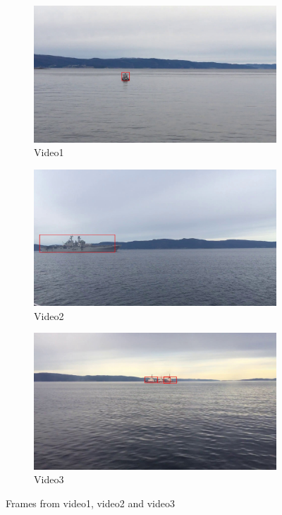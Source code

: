 \begin{figure}[h!]
\centering
\begin{subfigure}[b]{0.78\textwidth}
   \includegraphics[width=1\linewidth]{results/video/video1/frame35.jpg}
   \caption{Video1}
   \label{fig:video1} 
\end{subfigure}

\begin{subfigure}[b]{0.78\textwidth}
   \includegraphics[width=1\linewidth]{results/video/video2/frame3.jpg}
   \caption{Video2}
   \label{fig:video2}
\end{subfigure}

\begin{subfigure}[b]{0.78\textwidth}
   \includegraphics[width=1\linewidth]{results/video/video3/frame20.jpg}
   \caption{Video3}
   \label{fig:video3}
\end{subfigure}
\caption{Frames from video1, video2 and video3}
\label{fig:videos}
\end{figure}

